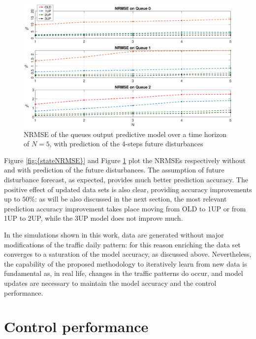 \begin{figure}[th!]
	\centering
	\includegraphics[trim={120 0 120 0}, width=0.9\linewidth]{figure/Error_State_ddM4.eps}
	\caption{NRMSE of the queues output predictive model over a time horizon of $N=5$, with prediction of the 4-steps future disturbances}
	\label{fig:{stateNRMSEddM4}}
\end{figure}

Figure \ref{fig:{stateNRMSE}} and Figure \ref{fig:{stateNRMSEddM4}} plot the NRMSEs respectively without and with prediction of the future disturbances. The assumption of future disturbance forecast, as expected, provides much better prediction accuracy. The positive effect of updated data sets is also clear, providing accuracy improvements up to $50 \%$: as will be also discussed in the next section, the most relevant prediction accuracy improvement takes place moving from OLD to 1UP or from 1UP to 2UP, while the 3UP model does not improve much.

\begin{remark}
In the simulations shown in this work, data are generated without major modifications of the traffic daily pattern: for this reason enriching the data set converges to a saturation of the model accuracy, as discussed above. Nevertheless, the capability of the proposed methodology to iteratively learn from new data is fundamental as, in real life, changes in the traffic patterns do occur, and model updates are necessary to maintain the model accuracy and the control performance. 
\end{remark}


\section{Control performance}

